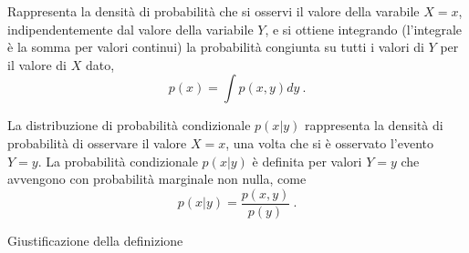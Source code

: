 \begin{definition}
    Rappresenta la densità di probabilità che si osservi il valore della varabile $X = x$, indipendentemente dal valore della variabile $Y$, e si ottiene integrando (l'integrale è la somma per valori continui) la probabilità congiunta su tutti i valori di $Y$ per il valore di $X$ dato,
    \begin{equation}
        p(x) = \int p(x,y) dy \ .
    \end{equation}
\end{definition}

\begin{definition} La distribuzione di probabilità condizionale $p(x|y)$ rappresenta la densità di probabilità di osservare il valore $X=x$, una volta che si è osservato l'evento $Y=y$. La probabilità condizionale $p(x|y)$ è definita per valori $Y=y$ che avvengono con probabilità marginale non nulla, come
    \begin{equation}\label{eqn:conditional:def}
        p(x|y) = \dfrac{p(x,y)}{p(y)} \ .
    \end{equation}
\end{definition}
{\color{red} Giustificazione della definizione}
\begin{example}
\end{example}
\begin{example}
\end{example}

